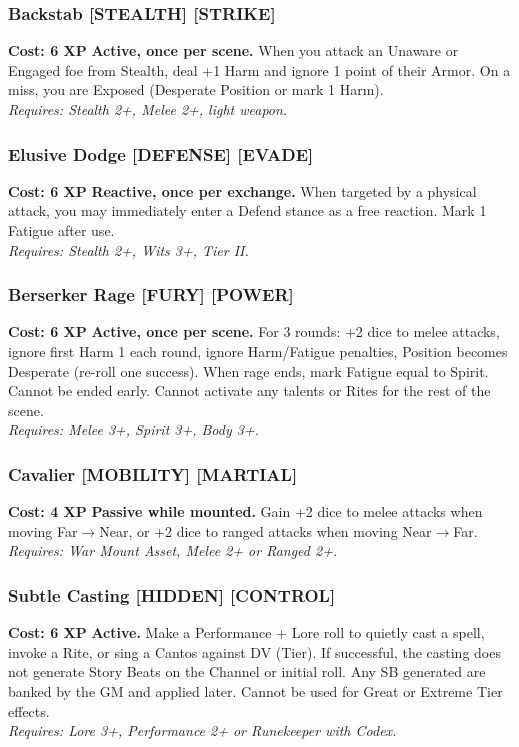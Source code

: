 \subsubsection*{Backstab \textnormal{[STEALTH] [STRIKE]}}
\label{talent:backstab}
\textbf{Cost: 6 XP} \textbf{Active, once per scene.} When you attack an Unaware or Engaged foe from Stealth, deal +1 Harm and ignore 1 point of their Armor. On a miss, you are Exposed (Desperate Position or mark 1 Harm). \\
\textit{Requires: Stealth 2+, Melee 2+, light weapon.}

\subsubsection*{Elusive Dodge \textnormal{[DEFENSE] [EVADE]}}
\label{talent:elusive-dodge}
\textbf{Cost: 6 XP} \textbf{Reactive, once per exchange.} When targeted by a physical attack, you may immediately enter a Defend stance as a free reaction. Mark 1 Fatigue after use. \\
\textit{Requires: Stealth 2+, Wits 3+, Tier II.}

\subsubsection*{Berserker Rage \textnormal{[FURY] [POWER]}}
\label{talent:berserker-rage}
\textbf{Cost: 6 XP} \textbf{Active, once per scene.} For 3 rounds: +2 dice to melee attacks, ignore first Harm 1 each round, ignore Harm/Fatigue penalties, Position becomes Desperate (re-roll one success). When rage ends, mark Fatigue equal to Spirit. Cannot be ended early. Cannot activate any talents or Rites for the rest of the scene. \\
\textit{Requires: Melee 3+, Spirit 3+, Body 3+.}

\subsubsection*{Cavalier \textnormal{[MOBILITY] [MARTIAL]}}
\label{talent:cavalier}
\textbf{Cost: 4 XP} \textbf{Passive while mounted.} Gain +2 dice to melee attacks when moving Far$\rightarrow$Near, or +2 dice to ranged attacks when moving Near$\rightarrow$Far. \\
\textit{Requires: War Mount Asset, Melee 2+ or Ranged 2+.}

\subsubsection*{Subtle Casting \textnormal{[HIDDEN] [CONTROL]}}
\label{talent:subtle-casting}
\textbf{Cost: 6 XP} \textbf{Active.} Make a Performance + Lore roll to quietly cast a spell, invoke a Rite, or sing a Cantos against DV (Tier). If successful, the casting does not generate Story Beats on the Channel or initial roll. Any SB generated are banked by the GM and applied later. Cannot be used for Great or Extreme Tier effects. \\
\textit{Requires: Lore 3+, Performance 2+ or Runekeeper with Codex.}

